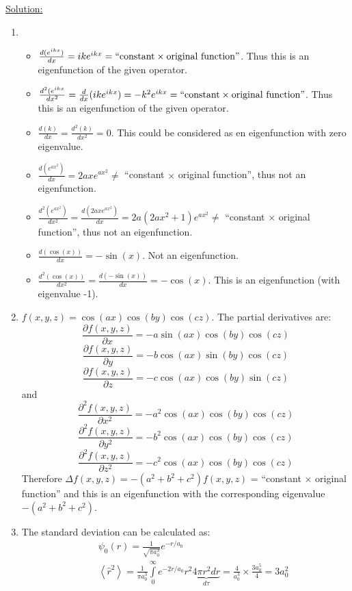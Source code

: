 \noindent
\underline{Solution:}\\
\begin{enumerate}
\item
\begin{itemize}
\item $\frac{d(e^{ikx})}{dx} = ike^{ikx} = \textnormal{``constant} \times \textnormal{original function''}$. Thus this is an eigenfunction of the given operator.
\item $\frac{d^2(e^{ikx}}{dx^2} = \frac{d}{dx}(ike^{ikx}) = -k^2e^{ikx} = \textnormal{``constant} \times \textnormal{original function''}$. Thus this is an eigenfunction of the given operator.
\item $\frac{d(k)}{dx} = \frac{d^2(k)}{dx^2} = 0$. This could be considered as en eigenfunction with zero eigenvalue.
\item $\frac{d(e^{ax^2})}{dx} = 2axe^{ax^2} \ne$ ``constant $\times$ original function'', thus not an eigenfunction.
\item $\frac{d^2(e^{ax^2})}{dx^2} = \frac{d(2axe^{ax^2})}{dx} = 2a(2ax^2 + 1)e^{ax^2} \ne$ ``constant $\times$ original function'', thus not an eigenfunction.
\item $\frac{d(\cos(x))}{dx} = -\sin(x)$. Not an eigenfunction.
\item $\frac{d^2(\cos(x))}{dx^2} = \frac{d(-\sin(x))}{dx} = -\cos(x)$. This is an eigenfunction (with eigenvalue -1).
\end{itemize}
\item $f(x, y, z) = \cos(ax)\cos(by)\cos(cz)$. The partial derivatives are:
$$\frac{\partial f(x,y,z)}{\partial x} = -a\sin(ax)\cos(by)\cos(cz)$$
$$\frac{\partial f(x,y,z)}{\partial y} = -b\cos(ax)\sin(by)\cos(cz)$$
$$\frac{\partial f(x,y,z)}{\partial z} = -c\cos(ax)\cos(by)\sin(cz)$$
and
$$\frac{\partial^2 f(x,y,z)}{\partial x^2} = -a^2\cos(ax)\cos(by)\cos(cz)$$
$$\frac{\partial^2 f(x,y,z)}{\partial y^2} = -b^2\cos(ax)\cos(by)\cos(cz)$$
$$\frac{\partial^2 f(x,y,z)}{\partial z^2} = -c^2\cos(ax)\cos(by)\cos(cz)$$
Therefore $\Delta f(x,y,z) = -(a^2 + b^2 + c^2)f(x,y,z)$ = ``constant $\times$ original function'' and this is an eigenfunction with
the corresponding eigenvalue $-(a^2 + b^2 + c^2)$.
\item The standard deviation can be calculated as:
\begin{eqnarray}
\nonumber
& & \psi_0(r) = \frac{1}{\sqrt{\pi a_0^3}} e^{-r/a_0}\\
\nonumber
& & \left<\hat{r}^2\right> = \frac{1}{\pi a_0^3}\int\limits_{0}^{\infty}e^{-2r/a_0}r^2\underbrace{4\pi r^2 dr}_{d\tau} = \frac{4}{a_0^3}\times\frac{3a_0^5}{4} = 3a_0^2\\

\end{eqnarray}
\end{enumerate}
